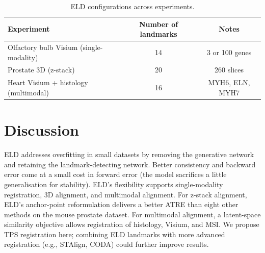\documentclass[11pt]{article}
\begin{document}
\begin{table}[h]
\centering
\caption{ELD configurations across experiments.}
\begin{tabular}{lcc}
\toprule
Experiment & Number of landmarks & Notes \\
\midrule
Olfactory bulb Visium (single-modality) & 14 & 3 or 100 genes \\
Prostate 3D (z-stack) & 20 & 260 slices \\
Heart Visium + histology (multimodal) & 16 & MYH6, ELN, MYH7 \\
\bottomrule
\end{tabular}
\end{table}

\section{Discussion}
ELD addresses overfitting in small datasets by removing the generative network and retaining the landmark-detecting network. Better consistency and backward error come at a small cost in forward error (the model sacrifices a little generalisation for stability). ELD's flexibility supports single-modality registration, 3D alignment, and multimodal alignment. For z-stack alignment, ELD's anchor-point reformulation delivers a better ATRE than eight other methods on the mouse prostate dataset. For multimodal alignment, a latent-space similarity objective allows registration of histology, Visium, and MSI. We propose TPS registration here; combining ELD landmarks with more advanced registration (e.g., STAlign, CODA) could further improve results.



\end{document}
